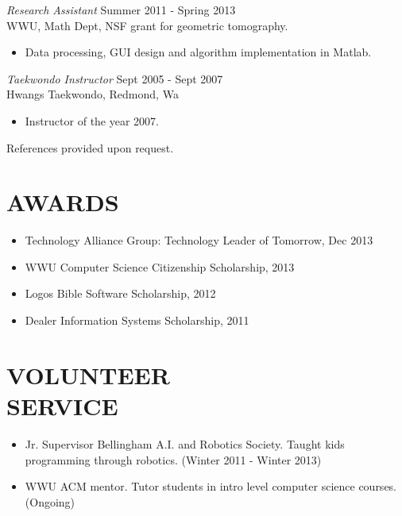 \documentclass[line,margin]{res}
\begin{document}
\begin{resume}
                	{\sl Research Assistant} \hfill            Summer 2011 - Spring 2013 \\
                	WWU, Math Dept, NSF grant for geometric tomography.
                 	\begin{itemize}  \itemsep -2pt
                 		\item Data processing, GUI design and algorithm implementation in Matlab.
                 	\end{itemize} 


		{\sl Taekwondo Instructor} \hfill Sept 2005 - Sept 2007 \\
		Hwangs Taekwondo, Redmond, Wa
		\begin{itemize}
			\item Instructor of the year 2007.
		\end{itemize}

	References provided upon request.
	
\section{AWARDS}
	\begin{itemize} \itemsep -1pt
		\item Technology Alliance Group: Technology Leader of Tomorrow, Dec 2013
		\item WWU Computer Science Citizenship Scholarship, 2013
		\item Logos Bible Software Scholarship, 2012
		\item Dealer Information Systems Scholarship, 2011
	\end{itemize}
\newpage
 
\section{VOLUNTEER \\ SERVICE}
		\begin{itemize} \itemsep -1pt
			\item Jr. Supervisor Bellingham A.I. and Robotics Society.  Taught kids programming through robotics. (Winter 2011 - Winter 2013)
			\item WWU ACM mentor.  Tutor students in intro level computer science courses.  (Ongoing)
		\end{itemize}


\end{resume}
\end{document}
